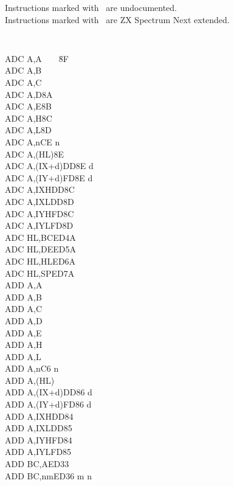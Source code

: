 \documentclass[12pt,twoside,openright,a4paper]{book}
\begin{document}
Instructions marked with \UNDOC ~are undocumented.\\
Instructions marked with \ZXN ~are ZX Spectrum Next extended.
\setlength\columnsep{4em}
\begin{multicols}{3}
{
	\tt 
	\footnotesize
	\begin{tabbing}
		ADC A,A~~~~{\qquad}{\quad}\=8F\\
		ADC A,B\\
		ADC A,C\\
		ADC A,D\>8A\\
		ADC A,E\>8B\\
		ADC A,H\>8C\\
		ADC A,L\>8D\\
		ADC A,n\>CE n\\
		ADC A,(HL)\>8E\\
		ADC A,(IX+d)\>DD8E d\\
		ADC A,(IY+d)\>FD8E d\\
		ADC A,IXH\UNDOC\>DD8C\\
		ADC A,IXL\UNDOC\>DD8D\\
		ADC A,IYH\UNDOC\>FD8C\\
		ADC A,IYL\UNDOC\>FD8D\\
		ADC HL,BC\>ED4A\\
		ADC HL,DE\>ED5A\\
		ADC HL,HL\>ED6A\\
		ADC HL,SP\>ED7A\\
		ADD A,A\\
		ADD A,B\\
		ADD A,C\\
		ADD A,D\\
		ADD A,E\\
		ADD A,H\\
		ADD A,L\\
		ADD A,n\>C6 n\\
		ADD A,(HL)\\
		ADD A,(IX+d)\>DD86 d\\
		ADD A,(IY+d)\>FD86 d\\
		ADD A,IXH\UNDOC\>DD84\\
		ADD A,IXL\UNDOC\>DD85\\
		ADD A,IYH\UNDOC\>FD84\\
		ADD A,IYL\UNDOC\>FD85\\
		ADD BC,A\ZXN\>ED33\\
		ADD BC,nm\ZXN\>ED36	m n\\

\end{tabbing}}
\end{multicols}
\end{document}
